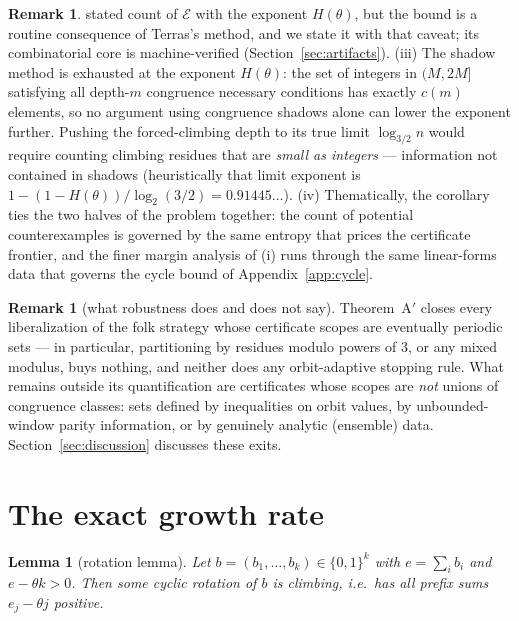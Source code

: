 \documentclass[11pt]{article}
\newtheorem{lemma}[theorem]{Lemma}
\theoremstyle{definition}
\newtheorem{remark}[theorem]{Remark}
\begin{document}
\begin{remark}
stated count of $\mathcal{E}$ with the exponent $H(\theta)$, but the
bound is a routine consequence of Terras's method, and we state it with
that caveat; its combinatorial core is machine-verified
(Section~\ref{sec:artifacts}). (iii) The shadow
method is exhausted at the exponent $H(\theta)$:
the set of integers in $(M,2M]$ satisfying all depth-$m$ congruence
necessary conditions has exactly $c(m)$ elements, so no argument using
congruence shadows alone can lower the exponent further. Pushing the
forced-climbing depth to its true limit $\log_{3/2}n$ would require
counting climbing residues that are \emph{small as integers} ---
information not contained in shadows (heuristically that limit exponent is
$1-(1-H(\theta))/\log_2(3/2)=0.91445\ldots$). (iv) Thematically, the corollary ties the two halves of the problem
together: the count of potential counterexamples is governed by the same
entropy that prices the certificate frontier, and the finer margin
analysis of (i) runs through the same linear-forms data that governs the
cycle bound of Appendix~\ref{app:cycle}.
\end{remark}

\begin{remark}[what robustness does and does not say]\label{rem:adaptivescope}
Theorem~A$'$ closes every liberalization of the folk strategy whose
certificate scopes are eventually periodic sets --- in particular,
partitioning by residues modulo powers of $3$, or any mixed modulus, buys
nothing, and neither does any orbit-adaptive stopping rule. What remains
outside its quantification are certificates whose scopes are \emph{not}
unions of congruence classes: sets defined by inequalities on orbit
values, by unbounded-window parity information, or by genuinely analytic
(ensemble) data. Section~\ref{sec:discussion} discusses these exits.
\end{remark}

\section{The exact growth rate}\label{sec:rate}

\begin{lemma}[rotation lemma]\label{lem:rotation}
Let $b=(b_1,\dots,b_k)\in\{0,1\}^k$ with $e=\sum_i b_i$ and $e-\theta k>0$.
Then some cyclic rotation of $b$ is climbing, i.e.\ has all prefix sums
$e_j-\theta j$ positive.
\end{lemma}
\end{document}

